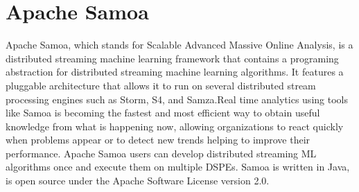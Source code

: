 \section{Apache Samoa}
Apache Samoa, which stands for Scalable Advanced Massive Online Analysis, is a distributed streaming machine learning framework that contains a programing abstraction for distributed streaming machine learning algorithms.\cite{samoa-web} It features a pluggable architecture that allows it to run on several distributed stream processing engines such as Storm, S4, and Samza.Real time analytics using tools like Samoa is becoming the fastest and most efficient way to obtain useful knowledge from what is happening now, allowing organizations to react quickly when problems appear or to detect new trends helping to improve their performance. \cite{samoa-MUSE} Apache Samoa users can develop distributed streaming ML algorithms once and execute them on multiple DSPEs. Samoa is written in Java, is open source under the Apache Software License version 2.0.\cite{ samoa-JMLR}

